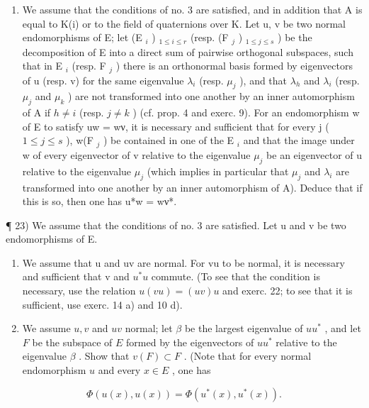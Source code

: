 \begin{enumerate}
\def\labelenumi{\arabic{enumi})}
\setcounter{enumi}{21}
\tightlist
\item
  We assume that the conditions of no. 3 are satisfied, and in addition that A is equal to K(i) or to the field of quaternions over K. Let u, v be two normal endomorphisms of E; let (E \(_{i}\) ) \(_{1\leqslant i\leqslant r}\) (resp. (F \(_{j}\) ) \(_{1\leqslant j\leqslant s}\) ) be the decomposition of E into a direct sum of pairwise orthogonal subspaces, such that in E \(_{i}\) (resp. F \(_{j}\) ) there is an orthonormal basis formed by eigenvectors of u (resp. v) for the same eigenvalue \(\lambda_{i}\) (resp. \(\mu_{j}\) ), and that \(\lambda_{h}\) and \(\lambda_{i}\) (resp. \(\mu_{j}\) and \(\mu_{k}\) ) are not transformed into one another by an inner automorphism of A if \(h\neq i\) (resp. \(j\neq k\) ) (cf. prop. 4 and exerc. 9). For an endomorphism w of E to satisfy uw = wν, it is necessary and sufficient that for every j ( \(1\leqslant j\leqslant s\) ), w(F \(_{j}\) ) be contained in one of the E \(_{i}\) and that the image under w of every eigenvector of v relative to the eigenvalue \(\mu_{j}\) be an eigenvector of u relative to the eigenvalue \(\mu_{j}\) (which implies in particular that \(\mu_{j}\) and \(\lambda_{i}\) are transformed into one another by an inner automorphism of A). Deduce that if this is so, then one has u*w = wν*.
\end{enumerate}

¶ 23) We assume that the conditions of no. 3 are satisfied. Let u and v be two endomorphisms of E.

\begin{enumerate}
\def\labelenumi{\alph{enumi})}
\item
  We assume that u and uv are normal. For vu to be normal, it is necessary and sufficient that v and \(u^{*}u\) commute. (To see that the condition is necessary, use the relation \(u(vu) = (uv)u\) and exerc. 22; to see that it is sufficient, use exerc. 14 a) and 10 d).
\item
  We assume \(u, v\) and \(uv\) normal; let \(\beta\) be the largest eigenvalue of \(uu^*\) , and let \(F\) be the subspace of \(E\) formed by the eigenvectors of \(uu^*\) relative to the eigenvalue \(\beta\) . Show that \(v(F) \subset F\) . (Note that for every normal endomorphism \(u\) and every \(x \in E\) , one has
\end{enumerate}

\[
\Phi (u (x), u (x)) = \Phi (u ^ {*} (x), u ^ {*} (x)).
\]

